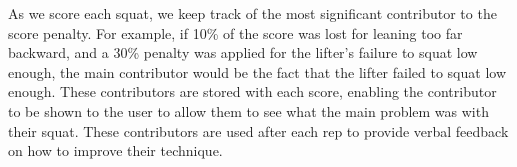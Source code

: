 As we score each squat, we keep track of the most significant contributor to the score penalty. For example, if 10\% of the score was lost for leaning too far backward, and a 30\% penalty was applied for the lifter's failure to squat low enough, the main contributor would be the fact that the lifter failed to squat low enough. These contributors are stored with each score, enabling the contributor to be shown to the user to allow them to see what the main problem was with their squat. These contributors are used after each rep to provide verbal feedback on how to improve their technique.
